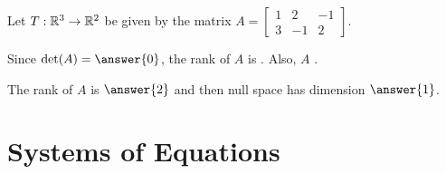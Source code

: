 \documentclass{ximera}
\begin{document}
\begin{example}
    Let $T:\mathbb{R}^3\to\mathbb{R}^2$ be given by the matrix $A = \begin{bmatrix} 1 & 2 & -1 \\ 3 & -1 & 2 \end{bmatrix}$.

    Since $\det(A) = \answer{0}$, the rank of $A$ is . Also, $A$ .

    The rank of $A$ is $\answer{2}$ and then null space has dimension $\answer{1}$.

\end{example}



\section*{Systems of Equations}
\end{document}

